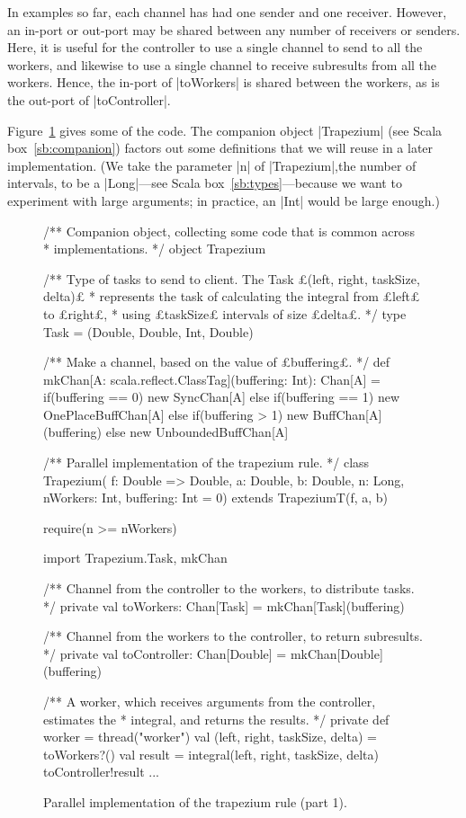 In examples so far, each channel has had one sender and one receiver.
However, an in-port or out-port may be shared between any number of receivers
or senders.  Here, it is useful for the controller to use a single channel to
send to all the workers, and likewise to use a single channel to receive
subresults from all the workers.  Hence, the in-port of |toWorkers| is shared
between the workers, as is the out-port of |toController|.  

Figure~\ref{fig:trapezium-1} gives some of the code.  The companion object
|Trapezium| (see Scala box~\ref{sb:companion}) factors out some definitions
that we will reuse in a later implementation.  (We take the parameter |n| of
|Trapezium|,the number of intervals, to be a |Long|---see Scala
box~\ref{sb:types}---because we want to experiment with large arguments; in
practice, an |Int| would be large enough.)


\begin{figure}
\begin{scala}
/** Companion object, collecting some code that is common across 
  * implementations. */
object Trapezium{
  /** Type of tasks to send to client.  The Task £(left, right, taskSize, delta)£
    * represents the task of calculating the integral from £left£ to £right£,
    * using £taskSize£ intervals of size £delta£. */
  type Task = (Double, Double, Int, Double)

  /** Make a channel, based on the value of £buffering£. */
  def mkChan[A: scala.reflect.ClassTag](buffering: Int): Chan[A] = 
    if(buffering == 0) new SyncChan[A] 
    else if(buffering == 1) new OnePlaceBuffChan[A]
    else if(buffering > 1) new BuffChan[A](buffering) 
    else new UnboundedBuffChan[A]
}

/** Parallel implementation of the trapezium rule. */
class Trapezium(
  f: Double => Double, a: Double, b: Double, 
  n: Long, nWorkers: Int, buffering: Int = 0)
    extends TrapeziumT(f, a, b){
  require(n >= nWorkers)

  import Trapezium.{Task, mkChan}

  /** Channel from the controller to the workers, to distribute tasks. */
  private val toWorkers: Chan[Task] = mkChan[Task](buffering)

  /** Channel from the workers to the controller, to return subresults. */
  private val toController: Chan[Double] = mkChan[Double](buffering)

  /** A worker, which receives arguments from the controller, estimates the
    * integral, and returns the results. */
  private def worker = thread("worker"){
    val (left, right, taskSize, delta) = toWorkers?()
    val result = integral(left, right, taskSize, delta)
    toController!result
  }
  ...
}
\end{scala}
\caption{Parallel implementation of the trapezium rule (part 1).}
\label{fig:trapezium-1}
\end{figure}

